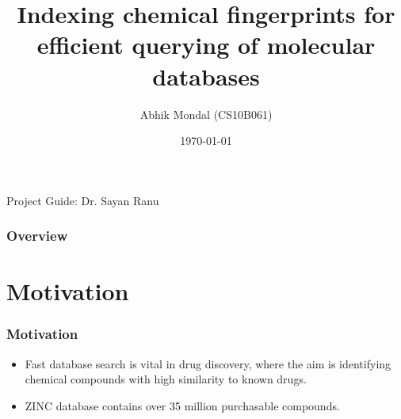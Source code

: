 \documentclass{beamer}
\title[Indexing fingerprints]{Indexing chemical fingerprints for efficient querying of molecular databases} %
\author{Abhik Mondal (CS10B061)} %
\institute[IIT Madras] %
{
IIT Madras \\ %
}
\date{\today} %
\begin{document}
\begin{frame}
\titlepage %
Project Guide: Dr. Sayan Ranu
\end{frame}
%

\begin{frame}
\frametitle{Overview} %
\tableofcontents %
\end{frame}




\section{Motivation}

\begin{frame}
\frametitle{Motivation}

\begin{itemize}

	\item<1-> Fast database search is vital in drug discovery, where the aim is identifying chemical compounds with high similarity to known drugs.


	\item<2->  ZINC database contains over 35 million purchasable compounds.	


\end{itemize}

\end{frame}
\end{document}
